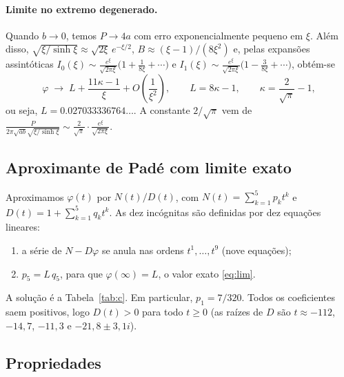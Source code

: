 \documentclass[11pt,a4paper]{article}
\theoremstyle{remark}
\begin{document}
\paragraph{Limite no extremo degenerado.} Quando $b\to0$, temos $P\to4a$ com
erro exponencialmente pequeno em $\xi$. Além disso, $\sqrt{\xi/\sinh\xi}\approx\sqrt{2\xi}\,e^{-\xi/2}$,
$B\approx(\xi-1)/(8\xi^2)$ e, pelas expansões assintóticas
$I_0(\xi)\sim\frac{e^\xi}{\sqrt{2\pi\xi}}\big(1+\frac1{8\xi}+\cdots\big)$ e
$I_1(\xi)\sim\frac{e^\xi}{\sqrt{2\pi\xi}}\big(1-\frac3{8\xi}+\cdots\big)$, obtém-se
\begin{equation}\label{eq:lim}
\varphi\;\longrightarrow\;L+\frac{11\kappa-1}{\xi}+O\!\left(\frac1{\xi^2}\right),
\qquad L=8\kappa-1,\qquad \kappa=\frac{2}{\sqrt\pi}-1,
\end{equation}
ou seja, $L=0.027033336764\ldots$. A constante $2/\sqrt\pi$ vem de
$\frac{P}{2\pi\sqrt{ab}\sqrt{\xi/\sinh\xi}}\sim\frac{2}{\sqrt\pi}\cdot\frac{e^\xi}{\sqrt{2\pi\xi}}$.

\subsection{Aproximante de Padé com limite exato}\label{sec:pade}

Aproximamos $\varphi(t)$ por $N(t)/D(t)$, com $N(t)=\sum_{k=1}^5p_kt^k$ e
$D(t)=1+\sum_{k=1}^5q_kt^k$. As dez incógnitas são definidas por dez equações lineares:
\begin{enumerate}
\item a série de $N-D\varphi$ se anula nas ordens $t^1,\dots,t^9$ (nove equações);
\item $p_5=L\,q_5$, para que $\varphi(\infty)=L$, o valor exato \eqref{eq:lim}.
\end{enumerate}
A solução é a Tabela~\ref{tab:c}. Em particular, $p_1=7/320$. Todos os
coeficientes saem positivos, logo $D(t)>0$ para todo $t\ge0$ (as raízes de
$D$ são $t\approx-112$, $-14{,}7$, $-11{,}3$ e $-21{,}8\pm3{,}1i$).

\subsection{Propriedades}
\end{document}
